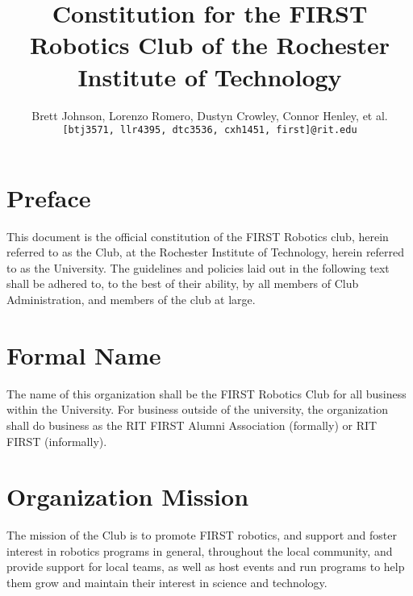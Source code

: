 \documentclass[english,11pt]{article}
\renewcommand{\footrulewidth}{1pt} %
\begin{document}
\title{Constitution for the FIRST Robotics Club of the Rochester Institute of Technology}
\author{
    Brett Johnson, Lorenzo Romero, Dustyn Crowley, Connor Henley, et al.  %
    \\
    \texttt{[btj3571, llr4395, dtc3536, cxh1451, first]@rit.edu}
}
\date{} %

\fancypagestyle{plain}{
    \fancyhf{}
    \rfoot{\today}
    \renewcommand{\footrulewidth}{0pt} %
}

\maketitle
\newpage %


\section*{Preface}
This document is the official constitution of the FIRST Robotics club, herein referred to as the Club, at the Rochester Institute of Technology, herein referred to as the University.
The guidelines and policies laid out in the following text shall be adhered to, to the best of their ability, by all members of Club Administration, and members of the club at large.

\section{Formal Name} \label{art:formal-name}
The name of this organization shall be the FIRST Robotics Club for all business within the University.
For business outside of the university, the organization shall do business as the RIT FIRST Alumni Association (formally) or RIT FIRST (informally).

\section{Organization Mission} \label{art:mission}
The mission of the Club is to promote FIRST robotics, and support and foster interest in robotics programs in general, throughout the local community, and provide support for local teams, as well as host events and run programs to help them grow and maintain their interest in science and technology.
\end{document}
